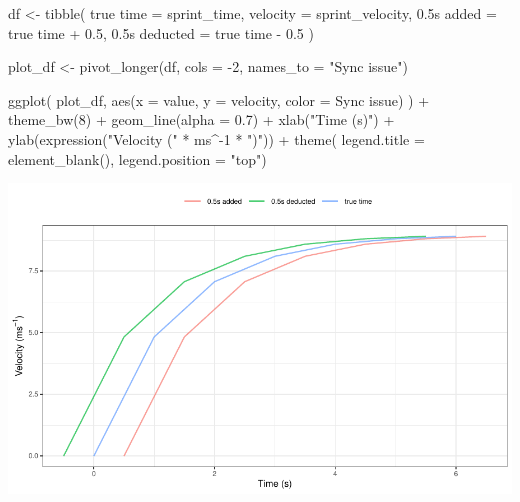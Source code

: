 \documentclass[fleqn,10pt,lineno]{wlpeerj} %
\newenvironment{Shaded}{\begin{snugshade}}{\end{snugshade}}
\newcommand{\AttributeTok}[1]{\textcolor[rgb]{0.77,0.63,0.00}{#1}}
\newcommand{\DecValTok}[1]{\textcolor[rgb]{0.00,0.00,0.81}{#1}}
\newcommand{\FloatTok}[1]{\textcolor[rgb]{0.00,0.00,0.81}{#1}}
\newcommand{\FunctionTok}[1]{\textcolor[rgb]{0.00,0.00,0.00}{#1}}
\newcommand{\NormalTok}[1]{#1}
\newcommand{\OtherTok}[1]{\textcolor[rgb]{0.56,0.35,0.01}{#1}}
\newcommand{\SpecialCharTok}[1]{\textcolor[rgb]{0.00,0.00,0.00}{#1}}
\newcommand{\StringTok}[1]{\textcolor[rgb]{0.31,0.60,0.02}{#1}}
\begin{document}
\begin{Shaded}
\begin{Highlighting}[]
\NormalTok{df }\OtherTok{\textless{}{-}} \FunctionTok{tibble}\NormalTok{(}
  \StringTok{\textasciigrave{}}\AttributeTok{true time}\StringTok{\textasciigrave{}} \OtherTok{=}\NormalTok{ sprint\_time,}
  \AttributeTok{velocity =}\NormalTok{ sprint\_velocity,}
  \StringTok{\textasciigrave{}}\AttributeTok{0.5s added}\StringTok{\textasciigrave{}} \OtherTok{=} \StringTok{\textasciigrave{}}\AttributeTok{true time}\StringTok{\textasciigrave{}} \SpecialCharTok{+} \FloatTok{0.5}\NormalTok{,}
  \StringTok{\textasciigrave{}}\AttributeTok{0.5s deducted}\StringTok{\textasciigrave{}} \OtherTok{=} \StringTok{\textasciigrave{}}\AttributeTok{true time}\StringTok{\textasciigrave{}} \SpecialCharTok{{-}} \FloatTok{0.5}
\NormalTok{)}

\NormalTok{plot\_df }\OtherTok{\textless{}{-}} \FunctionTok{pivot\_longer}\NormalTok{(df, }\AttributeTok{cols =} \SpecialCharTok{{-}}\DecValTok{2}\NormalTok{, }\AttributeTok{names\_to =} \StringTok{"Sync issue"}\NormalTok{)}

\FunctionTok{ggplot}\NormalTok{(}
\NormalTok{  plot\_df,}
  \FunctionTok{aes}\NormalTok{(}\AttributeTok{x =}\NormalTok{ value, }\AttributeTok{y =}\NormalTok{ velocity, }\AttributeTok{color =} \StringTok{\textasciigrave{}}\AttributeTok{Sync issue}\StringTok{\textasciigrave{}}\NormalTok{)}
\NormalTok{) }\SpecialCharTok{+}
  \FunctionTok{theme\_bw}\NormalTok{(}\DecValTok{8}\NormalTok{) }\SpecialCharTok{+}
  \FunctionTok{geom\_line}\NormalTok{(}\AttributeTok{alpha =} \FloatTok{0.7}\NormalTok{) }\SpecialCharTok{+}
  \FunctionTok{xlab}\NormalTok{(}\StringTok{"Time (s)"}\NormalTok{) }\SpecialCharTok{+}
  \FunctionTok{ylab}\NormalTok{(}\FunctionTok{expression}\NormalTok{(}\StringTok{"Velocity ("} \SpecialCharTok{*}\NormalTok{ ms}\SpecialCharTok{\^{}{-}}\DecValTok{1} \SpecialCharTok{*} \StringTok{")"}\NormalTok{)) }\SpecialCharTok{+}
  \FunctionTok{theme}\NormalTok{(}
    \AttributeTok{legend.title =} \FunctionTok{element\_blank}\NormalTok{(), }
    \AttributeTok{legend.position =} \StringTok{"top"}\NormalTok{)}
\end{Highlighting}
\end{Shaded}

\begin{center}\includegraphics[width=1\linewidth]{paper_files/figure-latex/unnamed-chunk-24-1} \end{center}
\end{document}
